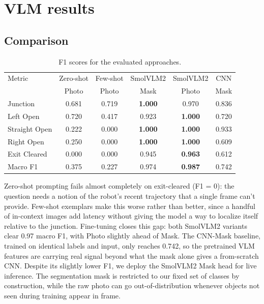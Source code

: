 \section{VLM results}
\label{appendix:vlmresults}









\subsection{Comparison}
\label{subsec:vlm_comparison}

\begin{table}[!ht]
\centering
\caption{F1 scores for the evaluated approaches.}
\label{tab:classification_results}
\small
\begin{tabular}{lccccc}
\toprule
Metric & Zero-shot & Few-shot & SmolVLM2 & SmolVLM2 & CNN \\
 & Photo & Photo & Mask & Photo & Mask \\
\midrule
Junction        & 0.681 & 0.719 & \textbf{1.000} & 0.970 & 0.836 \\
Left Open       & 0.720 & 0.417 & 0.923 & \textbf{1.000} & 0.720 \\
Straight Open   & 0.222 & 0.000 & \textbf{1.000} & \textbf{1.000} & 0.933 \\
Right Open      & 0.250 & 0.000 & \textbf{1.000} & \textbf{1.000} & 0.609 \\
Exit Cleared    & 0.000 & 0.000 & 0.945 & \textbf{0.963} & 0.612 \\
\midrule
Macro F1        & 0.375 & 0.227 & 0.974 & \textbf{0.987} & 0.742 \\
\bottomrule
\end{tabular}
\end{table}

Zero-shot prompting fails almost completely on exit-cleared (F1 = 0): the question needs a notion of the robot's recent trajectory that a single frame can't provide.
Few-shot exemplars make this worse rather than better, since a handful of in-context images add latency without giving the model a way to localize itself relative to the junction.
Fine-tuning closes this gap: both SmolVLM2 variants clear 0.97 macro F1, with Photo slightly ahead of Mask.
The CNN-Mask baseline, trained on identical labels and input, only reaches 0.742, so the pretrained VLM features are carrying real signal beyond what the mask alone gives a from-scratch CNN.
Despite its slightly lower F1, we deploy the SmolVLM2 Mask head for live inference. The segmentation mask is restricted to our fixed set of classes by construction, while the raw photo can go out-of-distribution whenever objects not seen during training appear in frame.
